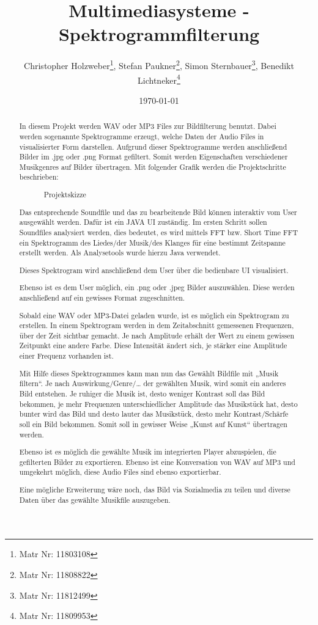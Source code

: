 \documentclass[12pt,a4paper]{article}
\title{Multimediasysteme - Spektrogrammfilterung}
\author{Christopher Holzweber\footnote{Matr Nr: 11803108}, Stefan Paukner\footnote{Matr Nr: 11808822}, Simon Sternbauer\footnote{Matr Nr: 11812499}, Benedikt Lichtneker\footnote{Matr Nr: 11809953}}
\date{\today}
\begin{document}
\maketitle %
\newpage
\tableofcontents %
\newpage

\begin{abstract}
In diesem Projekt werden WAV oder MP3 Files zur Bildfilterung benutzt.
Dabei werden sogenannte Spektrogramme erzeugt, welche Daten der Audio Files in visualisierter Form darstellen.
Aufgrund dieser Spektrogramme werden anschließend Bilder im .jpg oder .png Format gefiltert. Somit werden Eigenschaften verschiedener Musikgenres auf Bilder übertragen.
Mit folgender Grafik werden die Projektschritte beschrieben:

\begin{figure} [h]%
	\centering
	\label{fig:projectaufbau} 
	\caption{Projektskizze}
\end{figure}


Das entsprechende Soundfile und das zu bearbeitende Bild können interaktiv vom User ausgewählt werden. Dafür ist ein JAVA UI zuständig.
Im ersten Schritt sollen Soundfiles analysiert werden, dies bedeutet, es  wird mittels FFT bzw. Short Time FFT ein Spektrogramm des Liedes/der Musik/des Klanges für eine bestimmt Zeitspanne erstellt werden. Als Analysetools wurde hierzu Java verwendet.


Dieses Spektrogram wird anschließend dem User über die bedienbare UI visualisiert.

Ebenso ist es dem User möglich, ein .png oder .jpeg Bilder auszuwählen. Diese werden anschließend auf ein gewisses Format zugeschnitten.

Sobald eine WAV oder MP3-Datei geladen wurde, ist es möglich ein Spektrogram zu erstellen.
In einem Spektrogram werden in dem Zeitabschnitt gemessenen Frequenzen, über der Zeit sichtbar gemacht. Je nach Amplitude erhält der Wert zu einem gewissen Zeitpunkt eine andere Farbe. Diese Intensität ändert sich, je stärker eine Amplitude einer Frequenz vorhanden ist. 


Mit Hilfe dieses Spektrogrammes kann man nun das Gewählt Bildfile mit „Musik filtern“. Je nach Auswirkung/Genre/… der gewählten Musik, wird somit ein anderes Bild entstehen. Je ruhiger die Musik ist, desto weniger Kontrast soll das Bild bekommen, je mehr Frequenzen unterschiedlicher Amplitude das Musikstück hat, desto bunter wird das Bild und desto lauter das Musikstück, desto mehr Kontrast/Schärfe soll ein Bild bekommen. Somit soll in gewisser Weise „Kunst auf Kunst“ übertragen werden.

Ebenso ist es möglich die gewählte Musik im integrierten Player abzuspielen, die gefilterten Bilder zu exportieren. Ebenso ist eine Konversation von WAV auf MP3 und umgekehrt möglich, diese Audio Files sind ebenso exportierbar.

Eine mögliche Erweiterung wäre noch, das Bild via Sozialmedia zu teilen und diverse Daten über das gewählte Musikfile auszugeben.
\end{abstract}
\newpage
\end{document}
